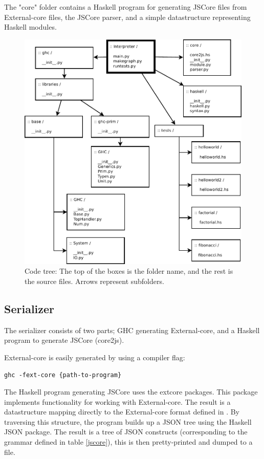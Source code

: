 The "core" folder contains a Haskell program for generating JSCore files from External-core
files, the JSCore parser, and a simple datastructure representing Haskell modules.

\begin{figure}[H]
\centering
\includegraphics[width=\textwidth]{diags/organization}
\caption[Code tree: organization]{Code tree: The top of the boxes is the folder name, 
and the rest is the source files. Arrows represent subfolders.}
\label{organization}
\end{figure}

\subsection{Serializer}

The serializer consists of two parts; GHC generating External-core, and 
a Haskell program to generate JSCore (core2js).

External-core is easily generated by using a compiler flag:
\begin{lstlisting}
ghc -fext-core {path-to-program}
\end{lstlisting}


The Haskell program generating JSCore uses the extcore packages. This package
implements functionality for working with External-core. The result is a datastructure
mapping directly to the External-core format defined in \cite{tolmach2010ghc}. By traversing
this structure, the program builds up a JSON tree using the Haskell JSON package.
The result is a tree of JSON constructs (corresponding to the grammar defined 
in table \ref{jscore}), this is then pretty-printed and dumped to a file.

